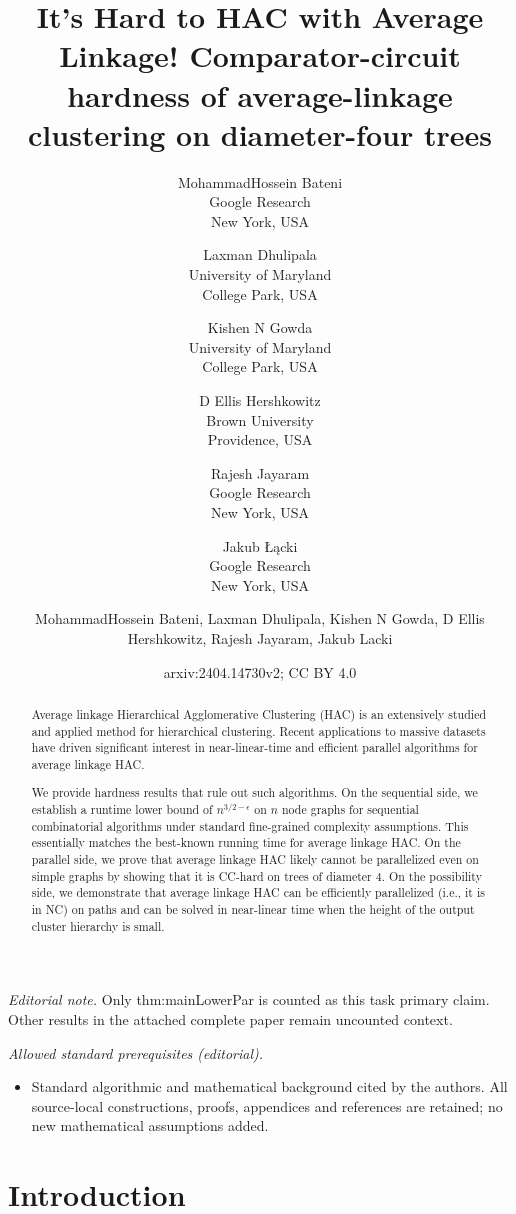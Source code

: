 \documentclass[11pt]{article}
\title{
It's Hard to HAC with Average Linkage!
}
\author{%
MohammadHossein Bateni\\%
Google Research\\%
New York, USA%
\and%
Laxman Dhulipala\\%
University of Maryland\\%
College Park, USA%
\and%
Kishen N Gowda\\%
University of Maryland\\
College Park, USA%
\and%
D Ellis Hershkowitz\\%
Brown University\\
Providence, USA%
\and%
Rajesh Jayaram\\%
Google Research\\
New York, USA%
\and%
Jakub Łącki\\%
Google Research\\
New York, USA%
}
\date{}
\title{Comparator-circuit hardness of average-linkage clustering on diameter-four trees}
\author{MohammadHossein Bateni, Laxman Dhulipala, Kishen N Gowda, D Ellis Hershkowitz, Rajesh Jayaram, Jakub Lacki}
\date{arxiv:2404.14730v2; CC BY 4.0}
\begin{document}
\maketitle
\noindent\textit{Editorial note.} Only thm:mainLowerPar is counted as this task primary claim. Other results in the attached complete paper remain uncounted context.\par\medskip
\noindent\textit{Allowed standard prerequisites (editorial).}\begin{itemize}
\item Standard algorithmic and mathematical background cited by the authors. All source-local constructions, proofs, appendices and references are retained; no new mathematical assumptions added.
\end{itemize}\medskip

\begin{abstract}
Average linkage Hierarchical Agglomerative Clustering (HAC) is an extensively studied and applied method for hierarchical clustering. Recent applications to massive datasets have driven significant interest in near-linear-time and efficient parallel algorithms for average linkage HAC.

We provide hardness results that rule out such algorithms. On the sequential side, we establish a runtime lower bound of $n^{3/2-\epsilon}$ on $n$ node graphs for sequential combinatorial algorithms under standard fine-grained complexity assumptions. This essentially matches the best-known running time for average linkage HAC. On the parallel side, we prove that average linkage HAC likely cannot be parallelized even on simple graphs by showing that it is CC-hard on trees of diameter $4$. On the possibility side, we demonstrate that average linkage HAC can be efficiently parallelized (i.e., it is in NC) on paths and can be solved in near-linear time when the height of the output cluster hierarchy is small.
\end{abstract}
\thispagestyle{empty}
\newpage
\setcounter{page}{1}

\section{Introduction}
\end{document}
